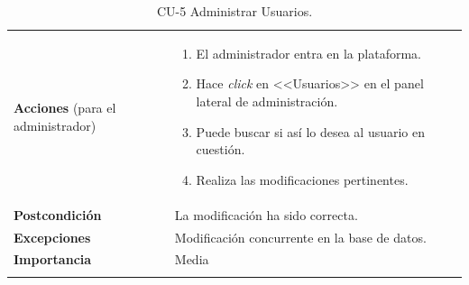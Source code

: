 \begin{longtable}[H]{@{}ll@{}}
\begin{minipage}[t]{0.23\columnwidth}
\textbf{Acciones} (para el administrador)\strut
\end{minipage} & \begin{minipage}[t]{0.71\columnwidth}\raggedright\strut
\begin{enumerate}
\def\labelenumi{\arabic{enumi}.}
\tightlist
\item El administrador entra en la plataforma.
\item Hace \textit{click} en <<Usuarios>> en el panel lateral de administración.
\item Puede buscar si así lo desea al usuario en cuestión.
\item Realiza las modificaciones pertinentes.
\end{enumerate}\strut
\end{minipage}\tabularnewline
\begin{minipage}[t]{0.23\columnwidth}\raggedright\strut
\textbf{Postcondición}\strut
\end{minipage} & \begin{minipage}[t]{0.71\columnwidth}\raggedright\strut
La modificación ha sido correcta.\strut
\end{minipage}\tabularnewline
\begin{minipage}[t]{0.23\columnwidth}\raggedright\strut
\textbf{Excepciones}\strut
\end{minipage} & \begin{minipage}[t]{0.71\columnwidth}\raggedright\strut
Modificación concurrente en la base de datos.\strut
\end{minipage}\tabularnewline
\begin{minipage}[t]{0.23\columnwidth}\raggedright\strut
\textbf{Importancia}\strut
\end{minipage} & \begin{minipage}[t]{0.71\columnwidth}\raggedright\strut
Media\strut
\end{minipage}\tabularnewline
\bottomrule
\caption{CU-5 Administrar Usuarios.}
\end{longtable}

